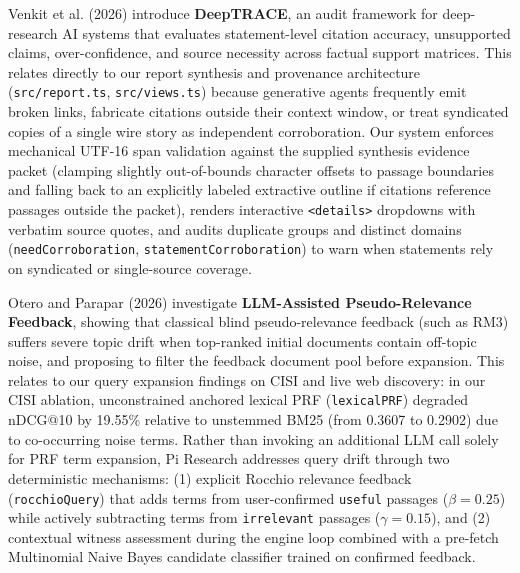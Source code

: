 \documentclass[conference]{IEEEtran}
\begin{document}
Venkit et al. (2026) introduce \textbf{DeepTRACE}, an audit framework for deep-research AI systems that evaluates statement-level citation accuracy, unsupported claims, over-confidence, and source necessity across factual support matrices. This relates directly to our report synthesis and provenance architecture (\texttt{src/report.ts}, \texttt{src/views.ts}) because generative agents frequently emit broken links, fabricate citations outside their context window, or treat syndicated copies of a single wire story as independent corroboration. Our system enforces mechanical UTF-16 span validation against the supplied synthesis evidence packet (clamping slightly out-of-bounds character offsets to passage boundaries and falling back to an explicitly labeled extractive outline if citations reference passages outside the packet), renders interactive \texttt{<details>} dropdowns with verbatim source quotes, and audits duplicate groups and distinct domains (\texttt{needCorroboration}, \texttt{statementCorroboration}) to warn when statements rely on syndicated or single-source coverage.

Otero and Parapar (2026) investigate \textbf{LLM-Assisted Pseudo-Relevance Feedback}, showing that classical blind pseudo-relevance feedback (such as RM3) suffers severe topic drift when top-ranked initial documents contain off-topic noise, and proposing to filter the feedback document pool before expansion. This relates to our query expansion findings on CISI and live web discovery: in our CISI ablation, unconstrained anchored lexical PRF (\texttt{lexicalPRF}) degraded nDCG@10 by 19.55\% relative to unstemmed BM25 (from 0.3607 to 0.2902) due to co-occurring noise terms. Rather than invoking an additional LLM call solely for PRF term expansion, Pi Research addresses query drift through two deterministic mechanisms: (1) explicit Rocchio relevance feedback (\texttt{rocchioQuery}) that adds terms from user-confirmed \texttt{useful} passages ($\beta = 0.25$) while actively subtracting terms from \texttt{irrelevant} passages ($\gamma = 0.15$), and (2) contextual witness assessment during the engine loop combined with a pre-fetch Multinomial Naive Bayes candidate classifier trained on confirmed feedback.
\end{document}
